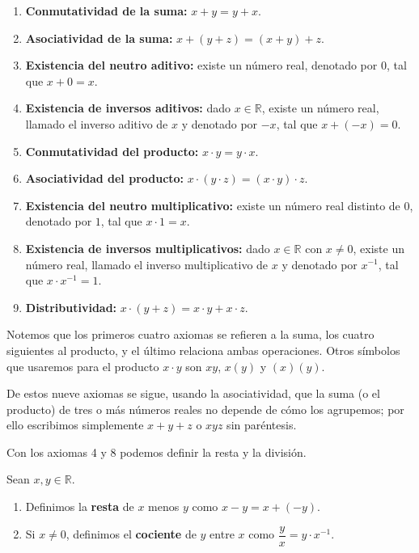 \documentclass[12pt,a4paper]{book}
\begin{document}
  \begin{enumerate}[leftmargin=2.4em]
    \item[\textbf{1.}] \textbf{Conmutatividad de la suma:} $x+y=y+x$.
    \item[\textbf{2.}] \textbf{Asociatividad de la suma:} $x+(y+z)=(x+y)+z$.
    \item[\textbf{3.}] \textbf{Existencia del neutro aditivo:} existe un número real, denotado por $0$, tal que $x+0=x$.
    \item[\textbf{4.}] \textbf{Existencia de inversos aditivos:} dado $x \in \mathbb{R}$, existe un número real, llamado el inverso aditivo de $x$ y denotado por $-x$, tal que $x+(-x)=0$.
    \item[\textbf{5.}] \textbf{Conmutatividad del producto:} $x\cdot y = y \cdot x$.
    \item[\textbf{6.}] \textbf{Asociatividad del producto:} $x\cdot(y\cdot z)=(x\cdot y)\cdot z$.
    \item[\textbf{7.}] \textbf{Existencia del neutro multiplicativo:} existe un número real distinto de $0$, denotado por $1$, tal que $x \cdot 1 = x$.
    \item[\textbf{8.}] \textbf{Existencia de inversos multiplicativos:} dado $x \in \mathbb{R}$ con $x \neq 0$, existe un número real, llamado el inverso multiplicativo de $x$ y denotado por $x^{-1}$, tal que $x \cdot x^{-1}=1$.
    \item[\textbf{9.}] \textbf{Distributividad:} $x\cdot(y+z) = x\cdot y + x\cdot z$.
  \end{enumerate}
  
  Notemos que los primeros cuatro axiomas se refieren a la suma, los cuatro siguientes al producto, y el último relaciona ambas operaciones. Otros símbolos que usaremos para el producto $x\cdot y$ son $xy$, $x(y)$ y $(x)(y)$.
  
  De estos nueve axiomas se sigue, usando la asociatividad, que la suma (o el producto) de tres o más números reales no depende de cómo los agrupemos; por ello escribimos simplemente $x+y+z$ o $xyz$ sin paréntesis.
  
  Con los axiomas 4 y 8 podemos definir la resta y la división.
  
  \begin{definicion}
    Sean $x,y \in \mathbb{R}$.
    \begin{enumerate}[label=(\alph*)]
      \item Definimos la \textbf{resta} de $x$ menos $y$ como $x-y = x+(-y)$.
      \item Si $x \neq 0$, definimos el \textbf{cociente} de $y$ entre $x$ como $\dfrac{y}{x} = y \cdot x^{-1}$.
    \end{enumerate}
  \end{definicion}
  
\end{document}
